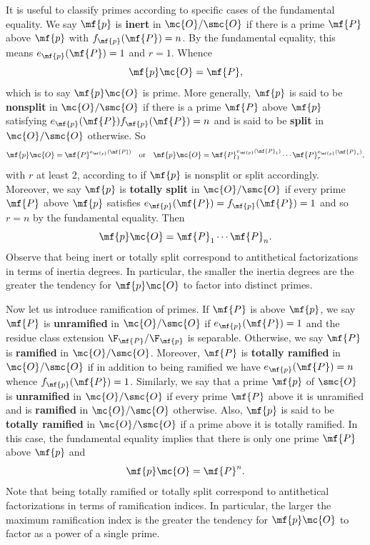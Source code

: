 \documentclass[12pt]{article}
\begin{document}
      It is useful to classify primes according to specific cases of the fundamental equality. We say \(\mf{p}\) is \textbf{inert} in \(\mc{O}/\smc{O}\) if there is a prime \(\mf{P}\) above \(\mf{p}\) with \(f_{\mf{p}}(\mf{P}) = n\). By the fundamental equality, this means \(e_{\mf{p}}(\mf{P}) = 1\) and \(r = 1\). Whence
      \[
        \mf{p}\mc{O} = \mf{P},
      \]
      which is to say \(\mf{p}\mc{O}\) is prime. More generally, \(\mf{p}\) is said to be \textbf{nonsplit} in \(\mc{O}/\smc{O}\) if there is a prime \(\mf{P}\) above \(\mf{p}\) satisfying \(e_{\mf{p}}(\mf{P})f_{\mf{p}}(\mf{P}) = n\) and is said to be \textbf{split} in \(\mc{O}/\smc{O}\) otherwise. So
      \[
        \mf{p}\mc{O} = \mf{P}^{e_{\mf{p}}(\mf{P})} \quad \text{or} \quad \mf{p}\mc{O} = \mf{P}_{1}^{e_{\mf{p}}(\mf{P}_{1})} \cdots \mf{P}_{r}^{e_{\mf{p}}(\mf{P}_{r})},
      \]
      with \(r\) at least \(2\), according to if \(\mf{p}\) is nonsplit or split accordingly. Moreover, we say \(\mf{p}\) is \textbf{totally split} in \(\mc{O}/\smc{O}\) if every prime \(\mf{P}\) above \(\mf{p}\) satisfies \(e_{\mf{p}}(\mf{P}) = f_{\mf{p}}(\mf{P}) = 1\) and so \(r = n\) by the fundamental equality. Then
      \[
        \mf{p}\mc{O} = \mf{P}_{1} \cdots \mf{P}_{n}.
      \]
      Observe that being inert or totally split correspond to antithetical factorizations in terms of inertia degrees. In particular, the smaller the inertia degrees are the greater the tendency for \(\mf{p}\mc{O}\) to factor into distinct primes.
      
      Now let us introduce ramification of primes. If \(\mf{P}\) is above \(\mf{p}\), we say \(\mf{P}\) is \textbf{unramified} in \(\mc{O}/\smc{O}\) if \(e_{\mf{p}}(\mf{P}) = 1\) and the residue class extension \(\F_{\mf{P}}/\F_{\mf{p}}\) is separable. Otherwise, we say \(\mf{P}\) is \textbf{ramified} in \(\mc{O}/\smc{O}\). Moreover, \(\mf{P}\) is \textbf{totally ramified} in \(\mc{O}/\smc{O}\) if in addition to being ramified we have \(e_{\mf{p}}(\mf{P}) = n\) whence \(f_{\mf{p}}(\mf{P}) = 1\). Similarly, we say that a prime \(\mf{p}\) of \(\smc{O}\) is \textbf{unramified} in \(\mc{O}/\smc{O}\) if every prime \(\mf{P}\) above it is unramified and is \textbf{ramified} in \(\mc{O}/\smc{O}\) otherwise. Also, \(\mf{p}\) is said to be \textbf{totally ramified} in \(\mc{O}/\smc{O}\) if a prime above it is totally ramified. In this case, the fundamental equality implies that there is only one prime \(\mf{P}\) above \(\mf{p}\) and
      \[
        \mf{p}\mc{O} = \mf{P}^{n}.
      \]
      Note that being totally ramified or totally split correspond to antithetical factorizations in terms of ramification indices. In particular, the larger the maximum ramification index is the greater the tendency for \(\mf{p}\mc{O}\) to factor as a power of a single prime.
\end{document}
